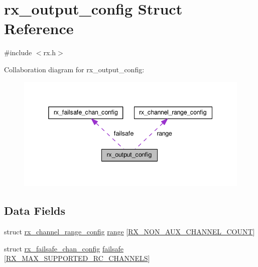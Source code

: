 \hypertarget{structrx__output__config}{\section{rx\+\_\+output\+\_\+config Struct Reference}
\label{structrx__output__config}
}


{\ttfamily \#include $<$rx.\+h$>$}



Collaboration diagram for rx\+\_\+output\+\_\+config\+:\nopagebreak
\begin{figure}[H]
\begin{center}
\leavevmode
\includegraphics[width=341pt]{structrx__output__config__coll__graph}
\end{center}
\end{figure}
\subsection*{Data Fields}
\begin{DoxyCompactItemize}
\item 
struct \hyperlink{structrx__channel__range__config}{rx\+\_\+channel\+\_\+range\+\_\+config} \hyperlink{structrx__output__config_ae687eede08b00f0d231b8f20a70a5383}{range} \mbox{[}\hyperlink{config_2rx_8h_ae92850ee98af420d60794888c70d4213}{R\+X\+\_\+\+N\+O\+N\+\_\+\+A\+U\+X\+\_\+\+C\+H\+A\+N\+N\+E\+L\+\_\+\+C\+O\+U\+N\+T}\mbox{]}
\item 
struct \hyperlink{structrx__failsafe__chan__config}{rx\+\_\+failsafe\+\_\+chan\+\_\+config} \hyperlink{structrx__output__config_aa75fb97b6c4122b48064059f2dbca384}{failsafe} \mbox{[}\hyperlink{config_2rx_8h_a36c9eafe7932465eb9940ff115cacacb}{R\+X\+\_\+\+M\+A\+X\+\_\+\+S\+U\+P\+P\+O\+R\+T\+E\+D\+\_\+\+R\+C\+\_\+\+C\+H\+A\+N\+N\+E\+L\+S}\mbox{]}
\end{DoxyCompactItemize}


